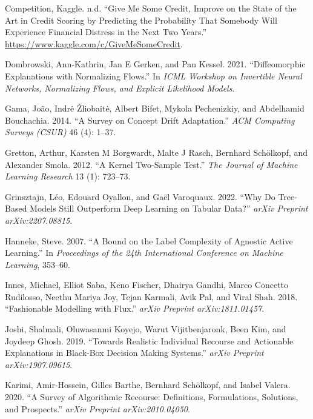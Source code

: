 \documentclass[conference,final,]{IEEEtran}
\newlength{\cslhangindent}
\newlength{\cslentryspacingunit} %
\newenvironment{CSLReferences}[2] %
 {%
  \setlength{\parindent}{0pt}
  \ifodd #1
  \let\oldpar\par
  \def\par{\hangindent=\cslhangindent\oldpar}
  \fi
  \setlength{\parskip}{#2\cslentryspacingunit}
 }%
 {}
\begin{document}
\begin{CSLReferences}{1}{0}
\leavevmode{}%
Competition, Kaggle. n.d. {``Give Me Some Credit, Improve on the State of the Art in Credit Scoring by Predicting the Probability That Somebody Will Experience Financial Distress in the Next Two Years.''} \url{https://www.kaggle.com/c/GiveMeSomeCredit}.

\leavevmode{}%
Dombrowski, Ann-Kathrin, Jan E Gerken, and Pan Kessel. 2021. {``Diffeomorphic Explanations with Normalizing Flows.''} In \emph{ICML Workshop on Invertible Neural Networks, Normalizing Flows, and Explicit Likelihood Models}.

\leavevmode{}%
Gama, João, Indrė Žliobaitė, Albert Bifet, Mykola Pechenizkiy, and Abdelhamid Bouchachia. 2014. {``A Survey on Concept Drift Adaptation.''} \emph{ACM Computing Surveys (CSUR)} 46 (4): 1--37.

\leavevmode{}%
Gretton, Arthur, Karsten M Borgwardt, Malte J Rasch, Bernhard Schölkopf, and Alexander Smola. 2012. {``A Kernel Two-Sample Test.''} \emph{The Journal of Machine Learning Research} 13 (1): 723--73.

\leavevmode{}%
Grinsztajn, Léo, Edouard Oyallon, and Gaël Varoquaux. 2022. {``Why Do Tree-Based Models Still Outperform Deep Learning on Tabular Data?''} \emph{arXiv Preprint arXiv:2207.08815}.

\leavevmode{}%
Hanneke, Steve. 2007. {``A Bound on the Label Complexity of Agnostic Active Learning.''} In \emph{Proceedings of the 24th International Conference on Machine Learning}, 353--60.

\leavevmode{}%
Innes, Michael, Elliot Saba, Keno Fischer, Dhairya Gandhi, Marco Concetto Rudilosso, Neethu Mariya Joy, Tejan Karmali, Avik Pal, and Viral Shah. 2018. {``Fashionable Modelling with Flux.''} \emph{arXiv Preprint arXiv:1811.01457}.

\leavevmode{}%
Joshi, Shalmali, Oluwasanmi Koyejo, Warut Vijitbenjaronk, Been Kim, and Joydeep Ghosh. 2019. {``Towards Realistic Individual Recourse and Actionable Explanations in Black-Box Decision Making Systems.''} \emph{arXiv Preprint arXiv:1907.09615}.

\leavevmode{}%
Karimi, Amir-Hossein, Gilles Barthe, Bernhard Schölkopf, and Isabel Valera. 2020. {``A Survey of Algorithmic Recourse: Definitions, Formulations, Solutions, and Prospects.''} \emph{arXiv Preprint arXiv:2010.04050}.


\end{CSLReferences}
\end{document}
